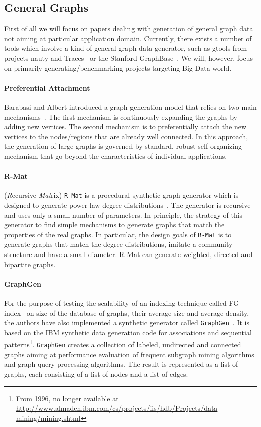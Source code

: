\subsection{General Graphs}
\label{sec:generators_general}

First of all we will focus on papers dealing with generation of general graph
data not aiming at particular application domain. Currently, there exists a
number of tools which involve a kind of general graph data generator, such as
gtools from projects nauty and Traces~\cite{gtools} or the Stanford
GraphBase~\cite{GraphBase}. We will, however, focus on primarily
generating/benchmarking projects targeting Big Data world.


\paragraph {Preferential Attachment} Barabasi and Albert introduced a graph generation model that relies on two main mechanisms~\cite{Barabasi99emergenceScaling}. The first mechanism is continuously expanding the graphs by adding new vertices. The second mechanism is to preferentially attach the new vertices   to the nodes/regions that are already well connected. In this approach, the generation of large graphs is governed by standard, robust self-organizing mechanism that go beyond the characteristics of individual applications.

\paragraph {R-Mat} (\emph{R}ecursive \emph{Mat}rix) \texttt{R-Mat} is a procedural synthetic graph generator which is designed to generate power-law degree
distributions~\cite{DBLP:conf/sdm/ChakrabartiZF04}.
The generator is recursive and uses only a small number of parameters.
In principle, the strategy of this generator to find simple mechanisms to generate graphs that match
the properties of the real graphs. In particular, the design goals of \texttt{R-Mat} is to generate graphs that match the degree distributions, imitate a community structure and have a small diameter. R-Mat can generate weighted, directed and bipartite graphs.

\paragraph{GraphGen} For the purpose of testing the scalability of an indexing
technique called FG-index~\cite{Cheng:2007:FTV:1247480.1247574} on size of the
database of graphs, their average size and average density, the authors have
also implemented a synthetic generator called \texttt{GraphGen}~\cite{GraphGen}. It is
based on the IBM synthetic data generation code for associations and sequential
patterns\footnote{From 1996, no longer available at
\url{http://www.almaden.ibm.com/cs/projects/iis/hdb/Projects/data
mining/mining.shtml}}. \texttt{GraphGen} creates a collection of labeled, undirected and
connected graphs aiming at performance evaluation of frequent subgraph mining
algorithms and graph query processing algorithms. The result is represented as a
list of graphs, each consisting of a list of nodes and a list of edges.




